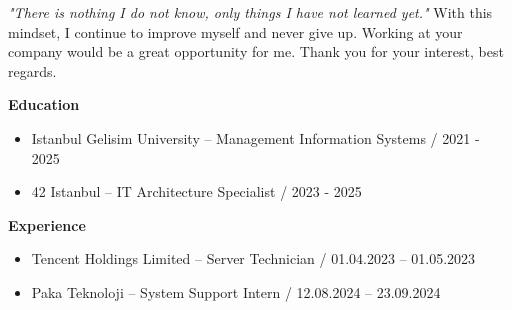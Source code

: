 \documentclass[a4paper,11pt]{article}
\begin{document}
\textit{"There is nothing I do not know, only things I have not learned yet."} With this mindset, I continue to improve myself and never give up. Working at your company would be a great opportunity for me. Thank you for your interest, best regards.

\vspace{0.4em}

\textbf{Education}
\vspace{-0.2em}
\begin{itemize}[leftmargin=2em]
  \item Istanbul Gelisim University – Management Information Systems / 2021 - 2025
  \item 42 Istanbul – IT Architecture Specialist / 2023 - 2025
\end{itemize}

\vspace{-0.1em}

\textbf{Experience}
\vspace{-0.2em}
\begin{itemize}[leftmargin=2em]
  \item Tencent Holdings Limited – Server Technician / 01.04.2023 – 01.05.2023
  \item Paka Teknoloji – System Support Intern / 12.08.2024 – 23.09.2024
\end{itemize}

\vspace{0.1em}
\end{document}
